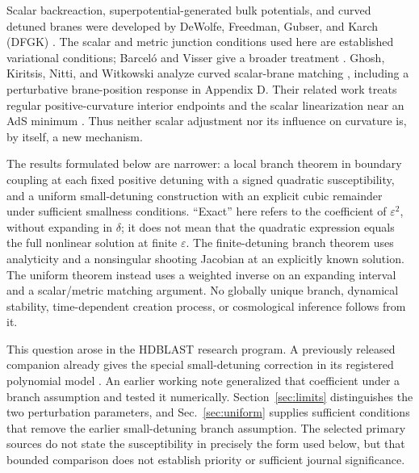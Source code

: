 \documentclass[11pt]{article}
\newcommand{\eps}{\varepsilon}
\begin{document}
Scalar backreaction, superpotential-generated bulk potentials, and curved detuned branes were developed by DeWolfe, Freedman, Gubser, and Karch (DFGK) \cite{dfgk}. The scalar and metric junction conditions used here are established variational conditions; Barcel\'o and Visser give a broader treatment \cite{bv}. Ghosh, Kiritsis, Nitti, and Witkowski analyze curved scalar-brane matching \cite{curvedbranes}, including a perturbative brane-position response in Appendix D. Their related work treats regular positive-curvature interior endpoints and the scalar linearization near an AdS minimum \cite{curvedflows}. Thus neither scalar adjustment nor its influence on curvature is, by itself, a new mechanism.

The results formulated below are narrower: a local branch theorem in boundary coupling at each fixed positive detuning with a signed quadratic susceptibility, and a uniform small-detuning construction with an explicit cubic remainder under sufficient smallness conditions. ``Exact'' here refers to the coefficient of $\eps^2$, without expanding in $\delta$; it does not mean that the quadratic expression equals the full nonlinear solution at finite $\eps$. The finite-detuning branch theorem uses analyticity and a nonsingular shooting Jacobian at an explicitly known solution. The uniform theorem instead uses a weighted inverse on an expanding interval and a scalar/metric matching argument. No globally unique branch, dynamical stability, time-dependent creation process, or cosmological inference follows from it.

This question arose in the HDBLAST research program. A previously released companion already gives the special small-detuning correction in its registered polynomial model \cite{companion}. An earlier working note generalized that coefficient under a branch assumption and tested it numerically. Section~\ref{sec:limits} distinguishes the two perturbation parameters, and Sec.~\ref{sec:uniform} supplies sufficient conditions that remove the earlier small-detuning branch assumption. The selected primary sources do not state the susceptibility in precisely the form used below, but that bounded comparison does not establish priority or sufficient journal significance.
\end{document}
